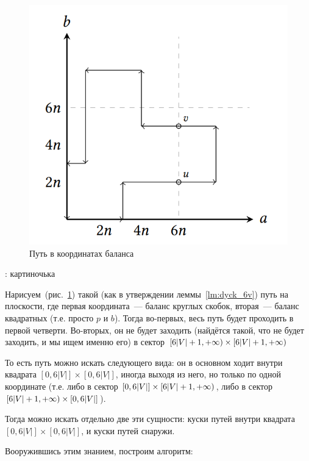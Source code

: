 \begin{figure}[h]
  \includegraphics[width=0.75\linewidth]{img/6n_6n_path}
  \caption{Путь в координатах баланса}
  \label{img:6v_path}
\end{figure}

\TODO: картиночька

Нарисуем~(рис.~\ref{img:6v_path}) такой (как в утверждении леммы~\ref{lm:dyck_6v}) путь на плоскости, где первая координата~--- баланс круглых скобок, вторая~--- баланс квадратных (т.е. просто $p$ и $b$). Тогда во-первых, весь путь будет проходить в первой четверти. Во-вторых, он не будет заходить (найдётся такой, что не будет заходить, и мы ищем именно его) в сектор $[6|V|+1, +\infty) \times [6|V|+1, +\infty)$
    
То есть путь можно искать следующего вида: он в основном ходит внутри квадрата $[0, 6|V|] \times [0, 6|V|]$, иногда выходя из него, но только по одной координате (т.е. либо в сектор $[0, 6|V|] \times [6|V| + 1, +\infty)$, либо в сектор $[6|V| + 1, +\infty) \times [0, 6|V|]$).

Тогда можно искать отдельно две эти сущности: куски путей внутри квадрата $[0, 6|V|] \times [0, 6|V|]$, и куски путей снаружи.


Вооружившись этим знанием, построим алгоритм:

